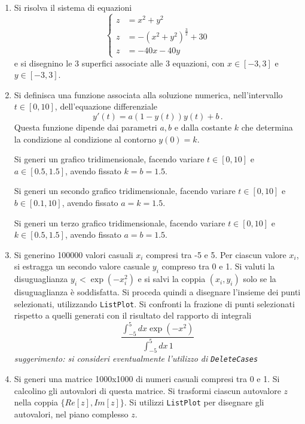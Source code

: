 \documentclass[12pt,italian]{article}
\newcommand{\be}{\begin{equation}}
\newcommand{\ee}{\end{equation}}
\begin{document}
\begin{enumerate}

\item
Si risolva il sistema di equazioni
$$
\left\{
\begin{array}{rl}
z&=x^2+y^2\\
z&=-(x^2+y^2)^{\frac32}+30\\
z&=-40x-40y
\end{array}
\right.
$$
e si disegnino le 3 superfici associate alle 3 equazioni, con $x\in[-3,3]$ e $y\in[-3,3]$.


\item
Si definisca una funzione associata alla soluzione numerica,
nell'intervallo $t\in [0,10]$,
dell'equazione differenziale
\be
y'(t)= a \left(1-y(t)\right) y(t) + b\, .
\ee
Questa funzione dipende dai parametri $a, b$ e dalla costante $k$
che determina la condizione al condizione al contorno $y(0)=k$.

Si generi un grafico tridimensionale,
facendo variare $t\in [0,10]$ e $a\in [0.5,1.5]$, avendo fissato $k=b=1.5$.

Si generi un secondo grafico tridimensionale,
facendo variare $t\in [0,10]$ e $b\in[0.1,10]$, avendo fissato $a=k=1.5$.

Si generi un terzo grafico tridimensionale,
facendo variare $t\in [0,10]$ e $k\in[0.5,1.5]$, avendo fissato $a=b=1.5$.








\item
Si generino 100000 valori casuali $x_i$ compresi tra -5 e 5.
Per ciascun valore $x_i$, si estragga un secondo valore casuale $y_i$ compreso tra 0 e 1.
Si valuti la disuguaglianza $y_i<\exp(-x_i^2)$ e si salvi la coppia $(x_i,y_i)$ solo se la disuguaglianza \`e soddisfatta. 
Si proceda quindi a disegnare l'insieme dei punti selezionati, utilizzando {\tt ListPlot}.
Si confronti la frazione di punti selezionati rispetto a quelli generati
con il risultato del rapporto di integrali 
$$
\frac{\int_{-5}^5 dx \exp(-x^2)}{\int_{-5}^5 dx \,1}
$$
{\it suggerimento: si consideri eventualmente l'utilizzo di {\tt DeleteCases}}

\item
Si generi una matrice 1000x1000 di numeri casuali compresi tra 0 e 1.
Si calcolino gli autovalori di questa matrice.
Si trasformi ciascun autovalore $z$ nella coppia $\{Re[z],Im[z]\}$.
Si utilizzi {\tt ListPlot} per disegnare gli autovalori, nel piano complesso $z$.


\end{enumerate}
\end{document}
